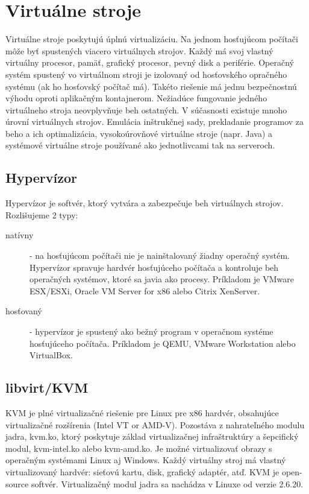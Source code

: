 \documentclass[11pt,final,oneside]{fithesis}
\begin{document}
\section{Virtuálne stroje}
Virtuálne stroje poskytujú úplnú virtualizáciu. Na jednom hosťujúcom počítači môže byť spustených viacero virtuálnych strojov. Každý má svoj vlastný virtuálny procesor, pamäť, grafický procesor, pevný disk 
a periférie. Operačný systém spustený vo virtuálnom stroji je izolovaný od hosťovského opračného systému (ak ho hosťovský počítač má). Takéto riešenie má jednu bezpečnostnú výhodu oproti aplikačným 
kontajnerom. Nežiadúce fungovanie jedného virtuálneho stroja neovplyvňuje beh ostatných.
V súčasnosti existuje mnoho úrovní virtuálnych strojov. Emulácia inštrukčnej sady, prekladanie programov za beho a ich optimalizácia, vysokoúrovňové virtuálne stroje (napr. Java) a systémové virtuálne stroje používané ako
jednotlivcami tak na serveroch.

\subsection{Hypervízor}
Hypervízor je softvér, ktorý vytvára a zabezpečuje beh virtuálnych strojov. Rozlišujeme 2 typy:
\begin{description}
\item[natívny] - na hosťujúcom počítači nie je nainštalovaný žiadny operačný systém. Hypervízor spravuje hardvér hosťujúceho počítača a kontroluje beh operačných systémov, ktoré sa javia ako procesy.
Príkladom je VMware ESX/ESXi, Oracle VM Server for x86 alebo Citrix XenServer.
\item[hosťovaný] - hypervízor je spustený ako bežný program v operačnom systéme hosťujúceho počítača. Príkladom je QEMU, VMware Workstation alebo VirtualBox.
\end{description}
\cite{hypervisorTypes}

\subsection{libvirt/KVM}
KVM\footnotemark{} je plné virtualizačné riešenie pre Linux pre x86 hardvér, obsahujúce virtualizačné rozšírenia (Intel VT or AMD-V).
Pozostáva z nahrateľného modulu jadra, kvm.ko, ktorý poskytuje základ virtualizačnej infraštruktúry a šepcifický modul, kvm-intel.ko alebo kvm-amd.ko. Je možné virtualizovať obrazy 
s operačným systémami Linux aj Windows. Každý virtuálny stroj má vlastný virtualizovaný hardvér: sieťovú kartu, disk, grafický adaptér, atď. KVM je open-source softvér. Virtualizačný modul jadra
sa nachádza v Linuxe od verzie 2.6.20.\cite{kvm}
\end{document}
